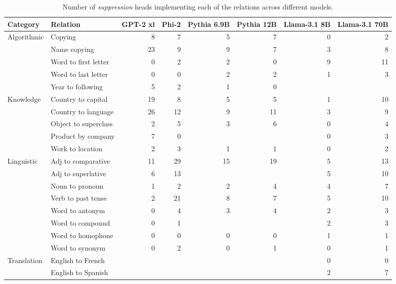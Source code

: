 \documentclass[11pt]{article}
\begin{document}
\begin{table}[htbp]
\centering
\footnotesize
\begin{tabular}{llrrrrrr}
\toprule
Category & Relation & GPT-2 xl & Phi-2 & Pythia 6.9B & Pythia 12B & Llama-3.1 8B & Llama-3.1 70B \\
\midrule
\multirow{5}{*}{Algorithmic} & Copying & 8 & 7 & 5 & 7 & 0 & 2 \\
 & Name copying & 23 & 9 & 9 & 7 & 3 & 8 \\
 & Word to first letter & 0 & 2 & 2 & 0 & 9 & 11 \\
 & Word to last letter & 0 & 0 & 2 & 2 & 1 & 3 \\
 & Year to following & 5 & 2 & 1 & 0 &  &  \\
 \midrule
\multirow{5}{*}{Knowledge} & Country to capital & 19 & 8 & 5 & 5 & 1 & 10 \\
 & Country to language & 26 & 12 & 9 & 11 & 3 & 9 \\
 & Object to superclass & 2 & 5 & 3 & 6 & 0 & 4 \\
 & Product by company & 7 & 0 &  &  & 0 & 3 \\
 & Work to location & 2 & 3 & 1 & 1 & 0 & 2 \\
 \midrule
\multirow{8}{*}{Linguistic} & Adj to comparative & 11 & 29 & 15 & 19 & 5 & 13 \\
 & Adj to superlative & 6 & 13 &  &  & 5 & 10 \\
 & Noun to pronoun & 1 & 2 & 2 & 4 & 4 & 7 \\
 & Verb to past tense & 2 & 21 & 8 & 7 & 5 & 10 \\
 & Word to antonym & 0 & 4 & 3 & 4 & 2 & 3 \\
 & Word to compound & 0 & 1 &  &  & 2 & 3 \\
 & Word to homophone & 0 & 0 & 0 & 0 & 1 & 1 \\
 & Word to synonym & 0 & 2 & 0 & 1 & 0 & 1 \\
 \midrule
\multirow{2}{*}{Translation} & English to French &  &  &  &  & 0 & 0 \\
 & English to Spanish &  &  &  &  & 2 & 7 \\
\bottomrule
\end{tabular}
\caption{Number of \emph{suppression} heads implementing each of the relations across different models. }
\label{tab:counts_of_classified_suppression_heads}
\end{table}
\end{document}

